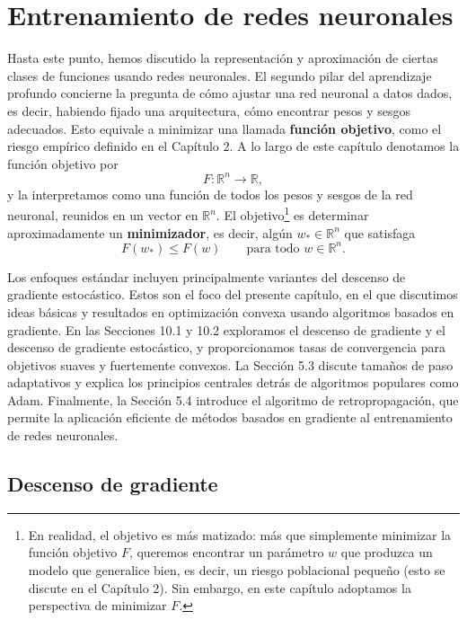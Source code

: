 \documentclass[11pt]{report}
\theoremstyle{definition}
\theoremstyle{plain}
\numberwithin{equation}{section}
\begin{document}
\chapter{Entrenamiento de redes neuronales}

Hasta este punto, hemos discutido la representación y aproximación de ciertas clases de funciones usando redes neuronales. El segundo pilar del aprendizaje profundo concierne la pregunta de cómo ajustar una red neuronal a datos dados, es decir, habiendo fijado una arquitectura, cómo encontrar pesos y sesgos adecuados. Esto equivale a minimizar una llamada \textbf{función objetivo}, como el riesgo empírico definido en el Capítulo 2. A lo largo de este capítulo denotamos la función objetivo por
\begin{equation*}
    F:\mathbb{R}^n\to\mathbb{R},
\end{equation*}
y la interpretamos como una función de todos los pesos y sesgos de la red neuronal, reunidos en un vector en \(\mathbb{R}^n\). El objetivo\footnote{En realidad, el objetivo es más matizado: más que simplemente minimizar la función objetivo \(F\), queremos encontrar un parámetro \(w\) que produzca un modelo que generalice bien, es decir, un riesgo poblacional pequeño (esto se discute en el Capítulo 2). Sin embargo, en este capítulo adoptamos la perspectiva de minimizar \(F\).} es determinar aproximadamente un \textbf{minimizador}, es decir, algún \(w_* \in \mathbb{R}^n\) que satisfaga
\begin{equation*}
    F(w_*)\leq F(w)
    \qquad
    \text{para todo } w\in\mathbb{R}^n.
\end{equation*}

Los enfoques estándar incluyen principalmente variantes del descenso de gradiente estocástico. Estos son el foco del presente capítulo, en el que discutimos ideas básicas y resultados en optimización convexa usando algoritmos basados en gradiente. En las Secciones 10.1 y 10.2 exploramos el descenso de gradiente y el descenso de gradiente estocástico, y proporcionamos tasas de convergencia para objetivos suaves y fuertemente convexos. La Sección 5.3 discute tamaños de paso adaptativos y explica los principios centrales detrás de algoritmos populares como Adam. Finalmente, la Sección 5.4 introduce el algoritmo de retropropagación, que permite la aplicación eficiente de métodos basados en gradiente al entrenamiento de redes neuronales.

\section{Descenso de gradiente}
\end{document}
